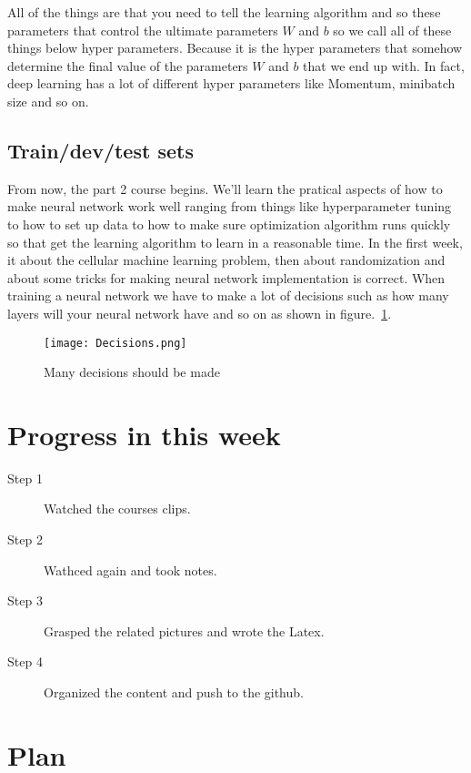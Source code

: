\documentclass[a4paper]{article}
\begin{document}
All of the things are that you need to tell the learning algorithm and so these parameters that control the ultimate parameters $W$ and $b$ so we call all of these things below hyper parameters. Because it is the hyper parameters that somehow determine the final value of the parameters $W$ and $b$ that we end up with. In fact, deep learning has a lot of different hyper parameters like Momentum, minibatch size and so on.


\subsection{Train/dev/test sets}
From now, the part 2 course begins. We'll learn the pratical aspects of how to make neural network work well ranging from things like hyperparameter tuning to how to set up data to how to make sure optimization algorithm runs quickly so that get the learning algorithm to learn in a reasonable time. In the first week, it about the cellular machine learning problem, then about randomization and about some tricks for making neural network implementation is correct. When training a neural network we have to make a lot of decisions such as how many layers will your neural network have and so on as shown in figure.~\ref{fig:Decisions}.

\begin{figure}[!htp]
\begin{center}
   \texttt{[image: Decisions.png]}
\end{center}
   \caption{Many decisions should be made~\cite{mooc.com,Coursera.org}}
\label{fig:Decisions}
\end{figure}


\section{Progress in this week}

\begin{description}
\item [Step 1]
Watched the courses clips.
\item[Step 2]
Wathced again and took notes.
\item[Step 3]
Grasped the related pictures and wrote the Latex.
\item[Step 4]
Organized the content and push to the github.
\end{description}


\section{Plan}
\end{document}

